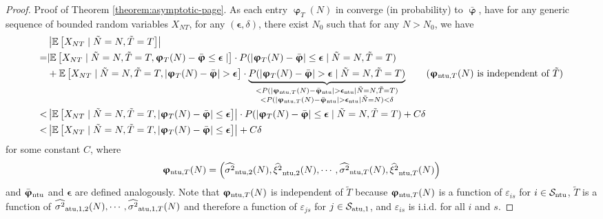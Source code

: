 \begin{proof}{Proof of Theorem \ref{theorem:asymptotic-page}.}
As each entry $\bm{\upvarphi}_T(N)$ in converge (in probability) to $\bar{\bm{\upvarphi}}$, have for any generic sequence of bounded random variables $X_{NT}$, for any $(\bm\epsilon, \delta)$, there exist $N_0$ such that for any $N > N_0$, we have 
\begin{align}
   & \nonumber \left|\+E\left[X_{NT} \mid \tilde{N} = N, \tilde{T} = T\right] \right| \\
  \nonumber =& |\+E\left[X_{NT} \mid  \tilde{N} = N, \tilde{T} = T, \bm{\upvarphi}_T(N) - \bar{\bm{\upvarphi}} \leq  \bm\epsilon \mid \right] \cdot P(|\bm{\upvarphi}_T(N) - \bar{\bm{\upvarphi}}| \leq  \bm\epsilon \mid \tilde{N} = N, \tilde{T} = T) \\ 
   \nonumber & + \+E\left[X_{NT} \mid  \tilde{N} = N, \tilde{T} = T, |\bm{\upvarphi}_T(N) - \bar{\bm{\upvarphi}}| >  \bm\epsilon \right] \cdot \underbrace{P(|\bm{\upvarphi}_T(N) - \bar{\bm{\upvarphi}}| >  \bm\epsilon \mid \tilde{N} = N, \tilde{T} = T) }_{\substack{< P(|\bm{\upvarphi}_{\fcs,T}(N) - \bar{\bm{\upvarphi}}_{\fcs}| >  \bm\epsilon_{\fcs} \mid \tilde{N} = N, \tilde{T} = T) \\ < P(|\bm{\upvarphi}_{\fcs,T}(N) - \bar{\bm{\upvarphi}}_{\fcs}| >  \bm\epsilon_{\fcs} \mid \tilde{N} = N) < \delta }} \tag{$\bm{\upvarphi}_{\fcs,T}(N)$ is independent of $\tilde T$} \\
    <& \left|\+E\left[X_{NT}  \mid \tilde{N} = N, \tilde{T} = T, |\bm{\upvarphi}_T(N) - \bar{\bm{\upvarphi}}| \leq  \bm\epsilon \right] \right|\cdot P(|\bm{\upvarphi}_T(N) - \bar{\bm{\upvarphi}}| \leq  \bm\epsilon \mid \tilde{N} = N, \tilde{T} = T) + C\delta  \\
     <& \left|\+E\left[X_{NT}  \mid \tilde{N} = N, \tilde{T} = T, |\bm{\upvarphi}_T(N) - \bar{\bm{\upvarphi}}| \leq  \bm\epsilon \right] \right| + C\delta \label{eqn:abs-prob-bound}
\end{align}
for some constant $C$, where 
\[\bm{\upvarphi}_{\mathrm{ntu},T}(N) = \left(\widehat{\sigma^2}_{\mathrm{ntu},2}(N), \widehat{\xi^2}_{\mathrm{ntu},2}(N), \cdots, \widehat{\sigma^2}_{\mathrm{ntu},T}(N), \widehat{\xi^2}_{\mathrm{ntu},T}(N) \right) \]
and $\bar{\bm{\upvarphi}}_{\mathrm{ntu}}$ and $\bm{\epsilon}$ are defined analogously. Note that $\bm{\upvarphi}_{\mathrm{ntu},T}(N)$ is independent of $\tilde{T}$ because $\bm{\upvarphi}_{\mathrm{ntu},T}(N)$ is a function of $\varepsilon_{is}$ for $i \in \mathcal{S}_{\mathrm{ntu}}$, $\tilde{T}$ is a function of $\widehat{\sigma^2}_{\mathrm{atu},1,2}(N), \cdots, \widehat{\sigma^2}_{\mathrm{atu},1,T}(N)$ and therefore a function of $\varepsilon_{js}$ for $j \in \mathcal{S}_{\mathrm{atu},1}$, and $\varepsilon_{is}$ is i.i.d. for all $i$ and $s$. 


\end{proof}
